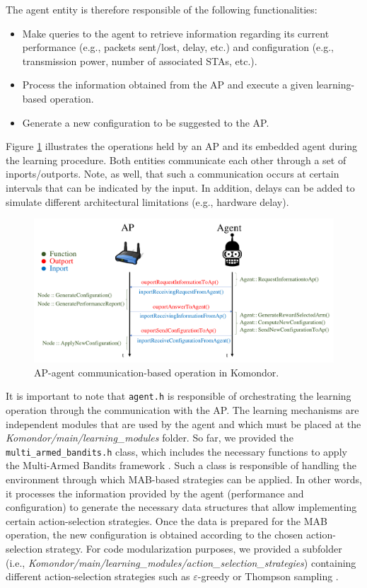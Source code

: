 \documentclass[a4paper]{article}
\begin{document}
The agent entity is therefore responsible of the following functionalities:
\begin{itemize}
	\item Make queries to the agent to retrieve information regarding its current performance (e.g., packets sent/lost, delay, etc.) and configuration (e.g., transmission power, number of associated STAs, etc.).
	\item Process the information obtained from the AP and execute a given learning-based operation.
	\item Generate a new configuration to be suggested to the AP.
\end{itemize} 

Figure \ref{fig:agents_komondor} illustrates the operations held by an AP and its embedded agent during the learning procedure. Both entities communicate each other through a set of inports/outports. Note, as well, that such a communication occurs at certain intervals that can be indicated by the input. In addition, delays can be added to simulate different architectural limitations (e.g., hardware delay). 

\begin{figure}[h]
	\centering
	\includegraphics[width=\textwidth]{images/agents_komondor.png}
	\caption{AP-agent communication-based operation in Komondor.}    
	\label{fig:agents_komondor}
\end{figure}

It is important to note that \texttt{agent.h} is responsible of orchestrating the learning operation through the communication with the AP. The learning mechanisms are independent modules that are used by the agent and which must be placed at the \textit{Komondor/main/learning\_modules} folder. So far, we provided the \texttt{multi\_armed\_bandits.h} class, which includes the necessary functions to apply the Multi-Armed Bandits framework \cite{auer2002finite}. Such a class is responsible of handling the environment through which MAB-based strategies can be applied. In other words, it processes the information provided by the agent (performance and configuration) to generate the necessary data structures that allow implementing certain action-selection strategies. Once the data is prepared for the MAB operation, the new configuration is obtained according to the chosen action-selection strategy. For code modularization purposes, we provided a subfolder (i.e., \textit{Komondor/main/learning\_modules/action\_selection\_strategies}) containing different action-selection strategies such as $\varepsilon$-greedy \cite{sutton1998reinforcement} or Thompson sampling \cite{thompson1933likelihood}.
\end{document}
